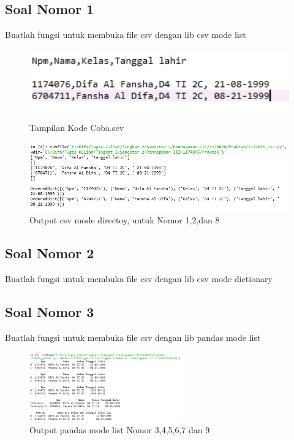 \subsection{Soal Nomor 1}
Buatlah fungsi untuk membuka file csv dengan lib csv mode list


\begin{figure}[!htbp]
  \centering
  \includegraphics[height=3cm]{figures/4/1174076/Praktek/coba.png}
  \caption{Tampilan Kode Coba.scv}
\end{figure}


\begin{figure}[!htbp]
  \centering
  \includegraphics[height=3cm]{figures/4/1174076/Praktek/1174076_csv.png}
  \caption{Output csv mode directoy, untuk Nomor 1,2,dan 8}
\end{figure}


\subsection{Soal Nomor 2}
Buatlah fungsi untuk membuka file csv dengan lib csv mode dictionary


\subsection{Soal Nomor 3}
Buatlah fungsi untuk membuka file csv dengan lib pandas mode list

\begin{figure}[!htbp]
  \centering
  \includegraphics[height=3cm]{figures/4/1174076/Praktek/1174076_pandas.png}
  \caption{Output pandas mode list Nomor 3,4,5,6,7 dan 9}
\end{figure}

